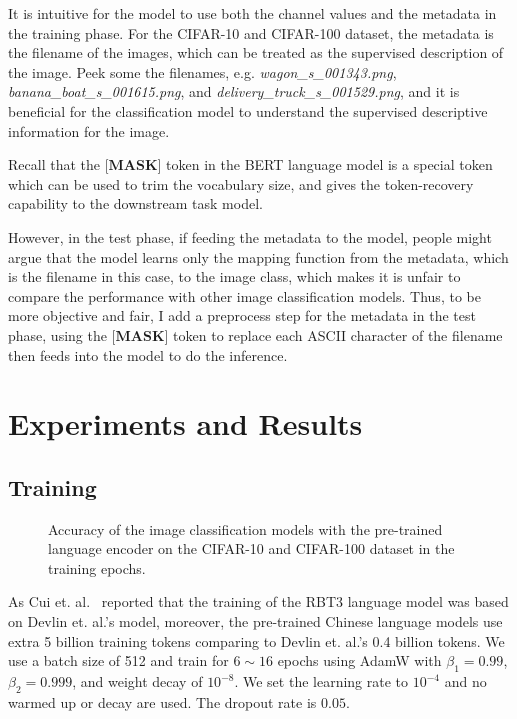 \documentclass[runningheads]{llncs}
\begin{document}
\par It is intuitive for the model to use both the channel values and the metadata in the training phase.
For the CIFAR-10 and CIFAR-100 dataset, the metadata is the filename of the images, which can be treated as the supervised description of the image.
Peek some the filenames, e.g. \textit{wagon\_s\_001343.png}, \textit{banana\_boat\_s\_001615.png}, and \textit{delivery\_truck\_s\_001529.png},
and it is beneficial for the classification model to understand the supervised descriptive information for the image.

\par Recall that the $\textbf{[MASK]}$ token in the BERT language model is a special token which can be used to trim the vocabulary size,
and gives the token-recovery capability to the downstream task model.

\par However, in the test phase, if feeding the metadata to the model, people might argue that the model learns only the mapping function from
the metadata, which is the filename in this case, to the image class, which makes it is unfair to compare the performance with other image classification models.
Thus, to be more objective and fair, I add a preprocess step for the metadata in the test phase, using the $\textbf{[MASK]}$ token to replace each
ASCII character of the filename then feeds into the model to do the inference.



\section{Experiments and Results}


\subsection{Training}

\begin{figure*}
\begin{center}
\end{center}
   \caption{Accuracy of the image classification models with the pre-trained language encoder on the CIFAR-10 and CIFAR-100 dataset in the training epochs.}
\label{fig:short}
\end{figure*}


As Cui et. al.~\cite{cui2020revisiting} reported that the training of the RBT3 language model was based on Devlin et. al.'s model,
moreover, the pre-trained Chinese language models use extra 5 billion training tokens comparing to Devlin et. al.'s 0.4 billion tokens.
We use a batch size of 512 and train for $6\sim16$ epochs using AdamW with $\beta_1=0.99$, $\beta_2=0.999$, and weight decay of $10^{-8}$.
We set the learning rate to $10^{-4}$ and no warmed up or decay are used.
The dropout rate is $0.05$.
\end{document}
